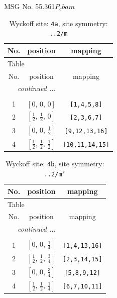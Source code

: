 \documentclass[fleqn,8pt]{jsarticle}
\begin{document}
\setcounter{MaxMatrixCols}{32}

\renewcommand{\tablename}{Table~}
\renewcommand{\figurename}{Figure~}
\begin{center}
\LARGE
MSG No. 55.361\quad$P_{c}bam$
\end{center}
\renewcommand{\arraystretch}{1.2}
\begin{longtable}{ccc}
\caption{Wyckoff site: {\tt 4a}, site symmetry: {\tt ..2/m}}
 \\
 \hline \hline
No. & position & mapping \\ \hline \endfirsthead

\multicolumn{2}{l}{\tablename\ \thetable{}} \\
 \hline \hline
No. & position & mapping \\ \hline \endhead

 \hline \hline
\multicolumn{2}{r}{\footnotesize\it continued ...} \\ \endfoot

 \hline \hline
\multicolumn{2}{r}{} \\ \endlastfoot

1 & $\left[ 0,\, 0,\, 0 \right]$ & {\tt [1,4,5,8]} \\ \hline
2 & $\left[ \frac{1}{2},\, \frac{1}{2},\, 0 \right]$ & {\tt [2,3,6,7]} \\ \hline
3 & $\left[ 0,\, 0,\, \frac{1}{2} \right]$ & {\tt [9,12,13,16]} \\ \hline
4 & $\left[ \frac{1}{2},\, \frac{1}{2},\, \frac{1}{2} \right]$ & {\tt [10,11,14,15]} \\
\end{longtable}
\renewcommand{\arraystretch}{1.2}
\begin{longtable}{ccc}
\caption{Wyckoff site: {\tt 4b}, site symmetry: {\tt ..2/m'}}
 \\
 \hline \hline
No. & position & mapping \\ \hline \endfirsthead

\multicolumn{2}{l}{\tablename\ \thetable{}} \\
 \hline \hline
No. & position & mapping \\ \hline \endhead

 \hline \hline
\multicolumn{2}{r}{\footnotesize\it continued ...} \\ \endfoot

 \hline \hline
\multicolumn{2}{r}{} \\ \endlastfoot

1 & $\left[ 0,\, 0,\, \frac{1}{4} \right]$ & {\tt [1,4,13,16]} \\ \hline
2 & $\left[ \frac{1}{2},\, \frac{1}{2},\, \frac{3}{4} \right]$ & {\tt [2,3,14,15]} \\ \hline
3 & $\left[ 0,\, 0,\, \frac{3}{4} \right]$ & {\tt [5,8,9,12]} \\ \hline
4 & $\left[ \frac{1}{2},\, \frac{1}{2},\, \frac{1}{4} \right]$ & {\tt [6,7,10,11]} \\
\end{longtable}
\end{document}
